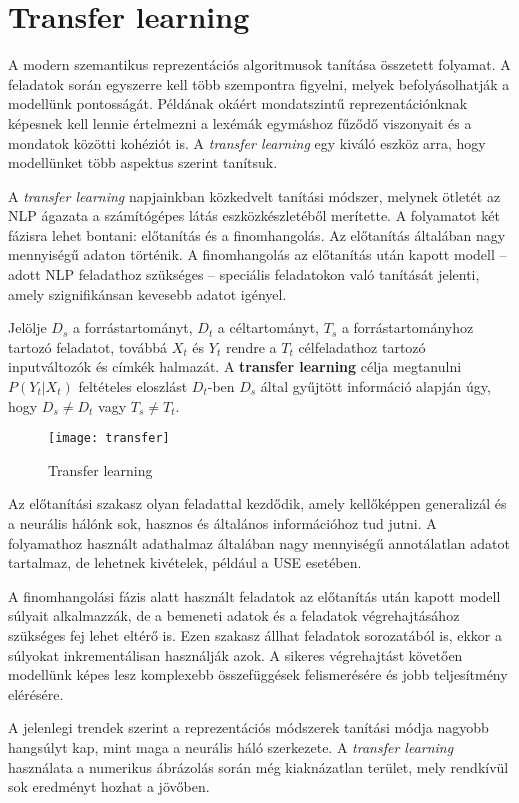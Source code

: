 \section{Transfer learning}

A modern szemantikus reprezentációs algoritmusok tanítása összetett folyamat. A feladatok során egyszerre kell több szempontra figyelni, melyek befolyásolhatják a modellünk pontosságát. Példának okáért mondatszintű reprezentációnknak képesnek kell lennie értelmezni a lexémák egymáshoz fűződő viszonyait és a mondatok közötti kohéziót is. A \textit{transfer learning} egy kiváló eszköz arra, hogy modellünket több aspektus szerint tanítsuk.

A \textit{transfer learning} napjainkban közkedvelt tanítási módszer, melynek ötletét az NLP ágazata a számítógépes látás eszközkészletéből merítette. A folyamatot két fázisra lehet bontani: előtanítás és a finomhangolás. Az előtanítás általában nagy mennyiségű adaton történik. A finomhangolás az előtanítás után kapott modell – adott NLP feladathoz szükséges – speciális feladatokon való tanítását jelenti, amely szignifikánsan kevesebb adatot igényel.

\begin{definition}
	Jelölje $D_s$ a forrástartományt, $D_t$ a céltartományt, $T_s$ a forrástartományhoz tartozó feladatot, továbbá $X_t$ és $Y_t$ rendre a $T_t$ célfeladathoz tartozó inputváltozók és  címkék halmazát. A \textbf{transfer learning} célja megtanulni $P(Y_t|X_t)$ feltételes eloszlást $D_t$-ben $D_s$ által gyűjtött információ alapján úgy, hogy $D_s \neq D_t$ vagy $T_s \neq T_t$.	 
\end{definition}

\begin{figure}[H]
	\centering
	\texttt{[image: transfer]}
	\caption{Transfer learning}
\end{figure}

Az előtanítási szakasz olyan feladattal kezdődik, amely kellőképpen generalizál és a neurális hálónk sok, hasznos és általános információhoz tud jutni. A folyamathoz használt adathalmaz általában nagy mennyiségű annotálatlan adatot tartalmaz, de lehetnek kivételek, például a USE esetében.

A finomhangolási fázis alatt használt feladatok az előtanítás után kapott modell súlyait alkalmazzák, de a bemeneti adatok és a feladatok végrehajtásához szükséges fej lehet eltérő is. Ezen szakasz állhat feladatok sorozatából is, ekkor a súlyokat inkrementálisan használják azok. A sikeres végrehajtást követően modellünk képes lesz komplexebb összefüggések felismerésére és jobb teljesítmény elérésére.

A jelenlegi trendek szerint a reprezentációs módszerek tanítási módja nagyobb hangsúlyt kap, mint maga a neurális háló szerkezete. A \textit{transfer learning} használata a numerikus ábrázolás során még kiaknázatlan terület, mely rendkívül sok eredményt hozhat a jövőben.







